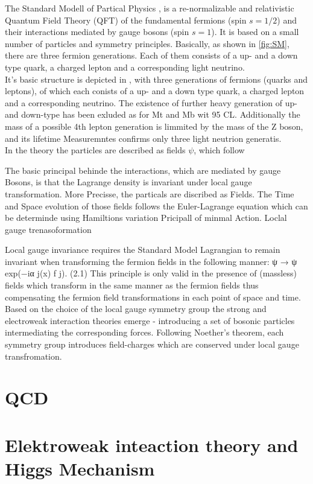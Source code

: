 The Standard Modell of Partical Physics , is a re-normalizable and relativistic Quantum Field Theory (QFT) of the fundamental fermions (spin $s =1/2$) and their interactions mediated by gauge bosons (spin $s = 1$).  It is based on a small number of particles and symmetry principles. Basically, as shown in \cref{fig:SM}, there are three fermion generations. Each of them consists of  a up- and a down type quark, a charged lepton and a corresponding light neutrino. \\ 

It's basic structure is depicted in   , with three generations of fermions (quarks and leptons), of which each conists of a up- and a down type quark, a charged lepton and a corresponding neutrino.  The existence of further heavy  generation of up- and down-type has been exluded as for Mt and Mb wit 95 CL.
Additionally the mass of a possible 4th lepton generation is limmited by the mass of the Z boson, and its lifetime Measuremntes confirms only three light neutrion generatis. \\ 





In the theory the particles are described as fields $\psi$, which follow 

\noindent The basic principal behinde the interactions, which are mediated by gauge Bosons, is  that the Lagrange density is invariant under local gauge transformation. More Precisse, the particals are discribed as Fields. The Time and Space evolution of those fields follows the Euler-Lagrange equation which can be determinde using Hamiltions variation Pricipall of minmal Action. 
Loclal gauge trenasoformation



Local gauge invariance requires the Standard Model Lagrangian to remain invariant when transforming the fermion fields in the following manner:
ψ → ψ exp(−iα j(x) f j). (2.1)
This principle is only valid in the presence of (massless) fields which transform in the same manner as the fermion fields thus compensating the fermion field transformations in each point of space and time. Based on the choice of the local gauge symmetry group the strong and electroweak interaction theories emerge - introducing a set of bosonic particles intermediating the corresponding forces. Following Noether’s theorem, each symmetry group introduces field-charges which are conserved under local gauge transfromation.





\clearpage

\clearpage


\section{QCD}


\clearpage
\section{Elektroweak inteaction theory and Higgs Mechanism}


\clearpage
